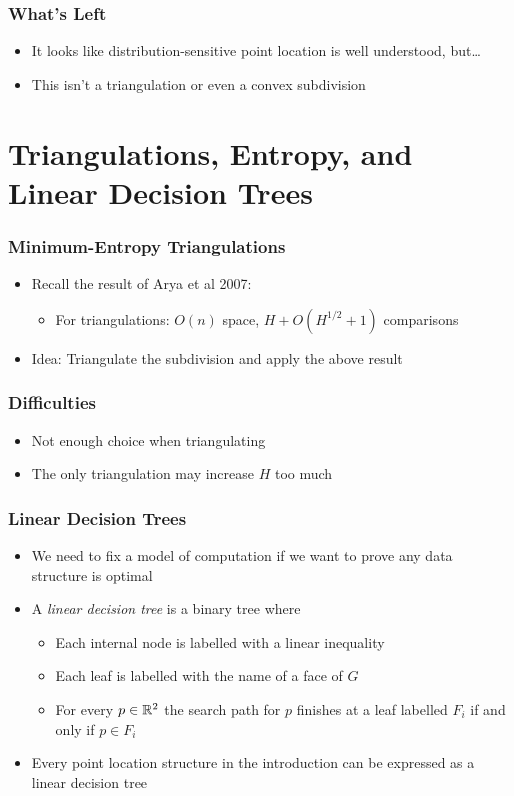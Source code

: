 \documentclass{beamer}
\begin{document}
\frame
{
   \frametitle{What's Left}
   \begin{itemize}
   \item<1-> It looks like distribution-sensitive point location is 
	well understood, but\ldots\\
   \begin{center}
   \end{center}
   \item<2-> This isn't a triangulation or even a convex subdivision
   \end{itemize}
}

\section{Triangulations, Entropy, and Linear Decision Trees}

\frame
{
   \frametitle{Minimum-Entropy Triangulations}
   \begin{itemize}
   \item<1-> Recall the result of Arya et al 2007:
     \begin{itemize}
      \item For triangulations: $O(n)$ space, $H+O(H^{1/2}+1)$ comparisons
     \end{itemize}
   \item<2-> Idea: Triangulate the subdivision and apply the above result
   \end{itemize}
}

\frame
{
   \frametitle{Difficulties}
   \begin{itemize}
   \item<1-> Not enough choice when triangulating
   \begin{center}
   \end{center}
   \item<2-> The only triangulation may increase $H$ too much
   \end{itemize}
}

\frame
{
   \frametitle{Linear Decision Trees}
   \begin{itemize}
     \item<1-> We need to fix a model of computation if we want to
       prove any data structure is optimal
     \item<2-> A \emph{linear decision tree} is a binary tree where
       \begin{itemize}
          \item Each internal node is labelled with a linear inequality
          \item Each leaf is labelled with the name of a face of $G$
          \item For every $p\in\mathbb{R}^2$ the search path for $p$ finishes at 
           a leaf labelled $F_i$ if and only if $p\in F_i$
       \end{itemize}
     \item<3-> Every point location structure in the
	introduction can be expressed as a linear decision tree
   \end{itemize}
}
\end{document}
